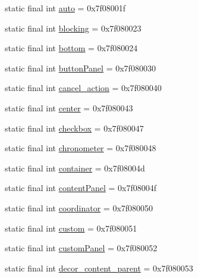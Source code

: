 \begin{DoxyCompactItemize}
static final int \mbox{\hyperlink{classandroid_1_1support_1_1design_1_1_r_1_1id_a425fdc3ba2fac6cb061ce14b2a605caf}{auto}} = 0x7f08001f
\item 
static final int \mbox{\hyperlink{classandroid_1_1support_1_1design_1_1_r_1_1id_a6505e8df123ea2e548a5d6ea4ff3c461}{blocking}} = 0x7f080023
\item 
static final int \mbox{\hyperlink{classandroid_1_1support_1_1design_1_1_r_1_1id_a79e61e6085c198377d3f88b7fd07fd77}{bottom}} = 0x7f080024
\item 
static final int \mbox{\hyperlink{classandroid_1_1support_1_1design_1_1_r_1_1id_acf364991cf5b4d5eab5726ffc663b9fe}{button\+Panel}} = 0x7f080030
\item 
static final int \mbox{\hyperlink{classandroid_1_1support_1_1design_1_1_r_1_1id_a846a5d8adf38692244186015845064be}{cancel\+\_\+action}} = 0x7f080040
\item 
static final int \mbox{\hyperlink{classandroid_1_1support_1_1design_1_1_r_1_1id_a8200e2d654b985ad1e81630039ed9c77}{center}} = 0x7f080043
\item 
static final int \mbox{\hyperlink{classandroid_1_1support_1_1design_1_1_r_1_1id_a83a2c2d0d9633468d1c4eae1e4e3c866}{checkbox}} = 0x7f080047
\item 
static final int \mbox{\hyperlink{classandroid_1_1support_1_1design_1_1_r_1_1id_ae85ae29fcbf218c6cc3f47c33466f9e5}{chronometer}} = 0x7f080048
\item 
static final int \mbox{\hyperlink{classandroid_1_1support_1_1design_1_1_r_1_1id_afb9511dea6949b04c835cccea1724f2d}{container}} = 0x7f08004d
\item 
static final int \mbox{\hyperlink{classandroid_1_1support_1_1design_1_1_r_1_1id_af8147990137f41589ca326c6cffc4243}{content\+Panel}} = 0x7f08004f
\item 
static final int \mbox{\hyperlink{classandroid_1_1support_1_1design_1_1_r_1_1id_a2b62305c4c2ed96abd7f329cd9cedd65}{coordinator}} = 0x7f080050
\item 
static final int \mbox{\hyperlink{classandroid_1_1support_1_1design_1_1_r_1_1id_a5e6da517eb0f33a54612c6496f88ba82}{custom}} = 0x7f080051
\item 
static final int \mbox{\hyperlink{classandroid_1_1support_1_1design_1_1_r_1_1id_ae72fd9603fa648f454993b341554eb57}{custom\+Panel}} = 0x7f080052
\item 
static final int \mbox{\hyperlink{classandroid_1_1support_1_1design_1_1_r_1_1id_a7a500f63633e64805d62d6c01d124d47}{decor\+\_\+content\+\_\+parent}} = 0x7f080053

\end{DoxyCompactItemize}
